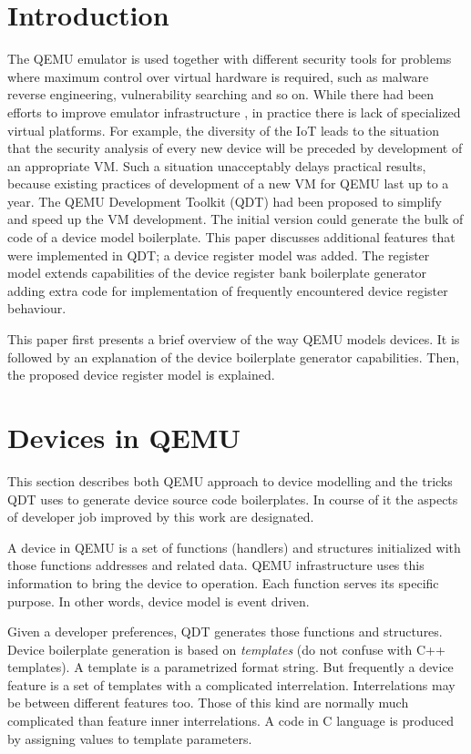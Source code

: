 \documentclass[conference,compsoc,a4paper]{IEEEtran}
\begin{document}
\section{Introduction}
The QEMU \cite{QEMU} emulator is used together with different security tools
for problems where
maximum control over virtual hardware is required, such as malware reverse
engineering,
vulnerability searching \cite{QEMUIdDynAn} and so on.
While there had been efforts to improve emulator infrastructure
\cite{QEMU-min-replay},
in practice there is lack of specialized virtual platforms.
For example, the diversity of the IoT leads to the situation that the security
analysis of every new device will be preceded by development of an appropriate
VM.
Such a situation unacceptably delays practical results, because existing
practices of development of a new VM for QEMU last up to a year.
The QEMU Development Toolkit (QDT) \cite{QDT} had been proposed to simplify and
speed up the VM development.
The initial version could generate the bulk of code of a device model
boilerplate.
This paper discusses additional features that were implemented in QDT; a device
register model was added.
The register model extends capabilities of the device register bank boilerplate
generator adding extra code for implementation of frequently encountered device
register behaviour.

This paper first presents a brief overview of the way QEMU models devices.
It is followed by an explanation of the device boilerplate generator
capabilities.
Then, the proposed device register model is explained.

\section{Devices in QEMU}

This section describes both QEMU approach to device modelling and the tricks
QDT uses to generate device source code boilerplates.
In course of it the aspects of developer job improved by this work are
designated.

A device in QEMU is a set of functions (handlers) and structures initialized
with those functions addresses and related data.
QEMU infrastructure uses this information to bring the device to operation.
Each function serves its specific purpose.
In other words, device model is event driven.

Given a developer preferences, QDT generates those functions and structures.
Device boilerplate generation is based on \textit{templates} (do not confuse
with C++ templates).
A template is a parametrized format string.
But frequently a device feature is a set of templates with a complicated
interrelation.
Interrelations may be between different features too.
Those of this kind are normally much complicated than feature inner
interrelations.
A code in C language is produced by assigning values to template parameters.
\end{document}
